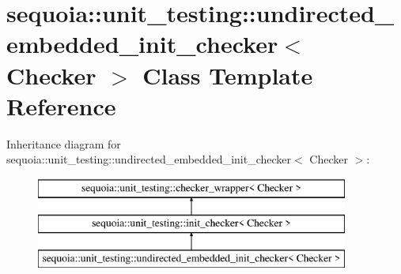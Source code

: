 \hypertarget{classsequoia_1_1unit__testing_1_1undirected__embedded__init__checker}{}\section{sequoia\+::unit\+\_\+testing\+::undirected\+\_\+embedded\+\_\+init\+\_\+checker$<$ Checker $>$ Class Template Reference}
\label{classsequoia_1_1unit__testing_1_1undirected__embedded__init__checker}
Inheritance diagram for sequoia\+::unit\+\_\+testing\+::undirected\+\_\+embedded\+\_\+init\+\_\+checker$<$ Checker $>$\+:\begin{figure}[H]
\begin{center}
\leavevmode
\includegraphics[height=3.000000cm]{classsequoia_1_1unit__testing_1_1undirected__embedded__init__checker}
\end{center}
\end{figure}
